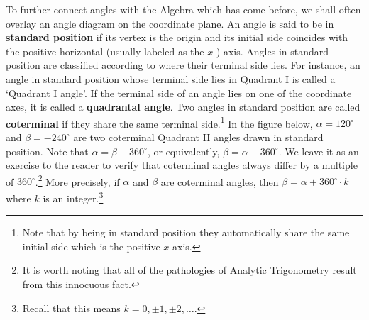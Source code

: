 \documentclass{ximera}
\begin{document}
To further connect angles with the Algebra which has come before, we shall often overlay an angle diagram on the coordinate plane.  An angle is said to be in \textbf{standard position} if its vertex is the origin and its initial side coincides with the positive horizontal (usually labeled as the $x$-) axis.  Angles in standard position are classified according to where their terminal side lies.  For instance, an angle in standard position whose terminal side lies in Quadrant I is called a `Quadrant I angle'.  If the terminal side of an angle lies on one of the coordinate axes, it is called a \textbf{quadrantal angle}.  Two angles in standard position are called \textbf{coterminal} if they share the same terminal side.\footnote{Note that by being in standard position they automatically share the same initial side which is the positive $x$-axis.}  In the figure below, $\alpha = 120^{\circ}$ and $\beta = -240^{\circ}$ are two coterminal Quadrant II angles drawn in standard position.    Note that $\alpha = \beta + 360^{\circ}$, or equivalently, $\beta = \alpha - 360^{\circ}$. We leave it as an exercise to the reader to verify that coterminal angles always differ by a multiple of $360^{\circ}$.\footnote{It is worth noting that all of the pathologies of Analytic Trigonometry result from this innocuous fact.} More precisely, if $\alpha$ and $\beta$ are coterminal angles, then $\beta = \alpha + 360^{\circ} \cdot k$ where $k$ is an integer.\footnote{Recall that this means $k = 0, \pm 1, \pm 2, \ldots$.}
\end{document}
